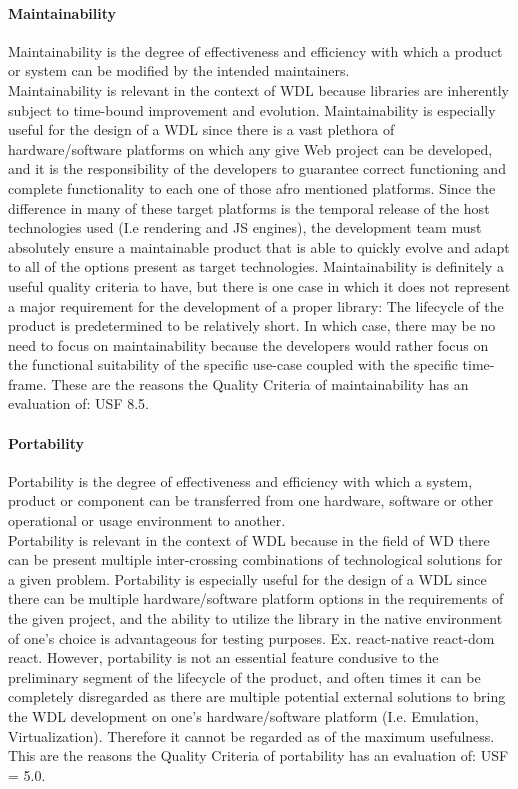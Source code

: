 \documentclass{article}
\begin{document}
\paragraph*{Maintainability}
Maintainability is the degree of effectiveness and efficiency with which a product or system can be modified by the intended maintainers.\\
Maintainability is relevant in the context of WDL because libraries are inherently subject to time-bound improvement and evolution.
Maintainability is especially useful for the design of a WDL since there is a vast plethora of hardware/software platforms on which any give Web project can be developed, and it is the responsibility of the developers to guarantee correct functioning and complete functionality to each one of those afro mentioned platforms. Since the difference in many of these target platforms is the temporal release of the host technologies used (I.e rendering and JS engines), the development team must absolutely ensure a maintainable product that is able to quickly evolve and adapt to all of the options present as target technologies.
Maintainability is definitely a useful quality criteria to have, but there is one case in which it does not represent a major requirement for the development of a proper library: The lifecycle of the product is predetermined to be relatively short. In which case, there may be no need to focus on maintainability because the developers would rather focus on the functional suitability of the specific use-case coupled with the specific time-frame.
These are the reasons the Quality Criteria of maintainability has an evaluation of: USF 8.5.

\paragraph*{Portability}
Portability is the degree of effectiveness and efficiency with which a system, product or component can be transferred from one hardware, software or other operational or usage environment to another.\\
Portability is relevant in the context of WDL because in the field of WD there can be present multiple inter-crossing combinations of technological solutions for a given problem.
Portability is especially useful for the design of a WDL since there can be multiple hardware/software platform options in the requirements of the given project, and the ability to utilize the library in the native environment of one's choice is advantageous for testing purposes.
Ex. react-native react-dom react.
However, portability is not an essential feature condusive to the preliminary segment of the lifecycle of the product, and often times it can be completely disregarded as there are multiple potential external solutions to bring the WDL development on one's hardware/software platform (I.e. Emulation, Virtualization). Therefore it cannot be regarded as of the maximum usefulness. This are the reasons the Quality Criteria of portability has an evaluation of: USF = 5.0.
\end{document}
